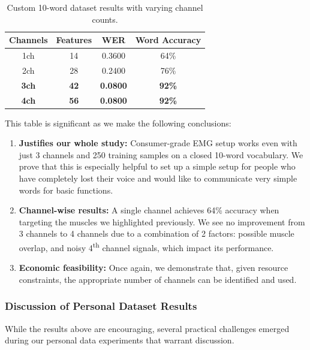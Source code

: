 \begin{table}[ht]
\centering
\caption{Custom 10-word dataset results with varying channel counts.}
\label{tab:custom_10word}
\begin{tabular}{cccc}
\toprule
\textbf{Channels} & \textbf{Features} & \textbf{WER} & \textbf{Word Accuracy} \\
\midrule
1ch & 14 & 0.3600 & 64\% \\
2ch & 28 & 0.2400 & 76\% \\
\rowcolor{gray!12} \textbf{3ch} & \textbf{42} & \textbf{0.0800} & \textbf{92\%} \\
\rowcolor{gray!12} \textbf{4ch} & \textbf{56} & \textbf{0.0800} & \textbf{92\%} \\
\bottomrule
\end{tabular}
\end{table}

This table is significant as we make the following conclusions:

\begin{enumerate}
    \item \textbf{Justifies our whole study:} Consumer-grade EMG setup works even with just 3 channels and 250 training samples on a closed 10-word vocabulary. We prove that this is especially helpful to set up a simple setup for people who have completely lost their voice and would like to communicate very simple words for basic functions.

    \item \textbf{Channel-wise results:} A single channel achieves 64\% accuracy when targeting the muscles we highlighted previously. We see no improvement from 3 channels to 4 channels due to a combination of 2 factors: possible muscle overlap, and noisy 4\textsuperscript{th} channel signals, which impact its performance.

    \item \textbf{Economic feasibility:} Once again, we demonstrate that, given resource constraints, the appropriate number of channels can be identified and used.
\end{enumerate}

\subsubsection{Discussion of Personal Dataset Results}

While the results above are encouraging, several practical challenges emerged during our personal data experiments that warrant discussion.

